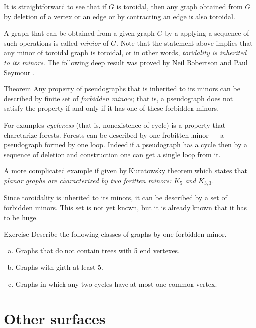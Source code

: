 It is straightforward to see that if $G$ is toroidal, then any graph obtained from $G$ by deletion of a vertex or an edge or by contracting an edge is also toroidal.

A graph that can be obtained from a given graph $G$ by a applying a sequence of such operations is called \emph{minior} of $G$.
Note that the statement above implies that any minor of toroidal graph is toroidal, or in other words, \emph{toridality is inherited to its minors}.
The following deep result was proved by Neil Robertson and Paul Seymour \cite{robertson-seymour}.

\begin{thm}{Theorem}
Any property of pseudographs that is inherited to its minors can be 
described by finite set of \emph{forbidden minors};
that is,  a pseudograph does not satisfy the property if and only if it has one of these forbidden minors.
\end{thm}

For examples \emph{cycleness} (that is, nonexistence of cycle) is a property that charctarize forests.
Forests can be described by one frobitten minor --- a pseudograph formed by one loop.
Indeed if a pseudograph has a cycle then by a sequence of deletion and construction one can get a single loop from it.

A more complicated example if given by Kuratowsky theorem which states that \emph{planar graphs are characterized by two foritten minors: $K_5$ and $K_{3,3}$.}

Since toroidality is inherited to its minors, it can be described by a set of forbidden minors.
This set is not yet known, but it is already known that it has to be huge.

\begin{thm}{Exercise}
Describe the following classes of graphs by one forbidden minor.
\begin{enumerate}[(a)]
 \item Graphs that do not contain trees with 5 end vertexes.
 \item Graphs with girth at least 5.
 \item Graphs in which any two cycles have at most one common vertex.
\end{enumerate}

\end{thm}

\section*{Other surfaces}

